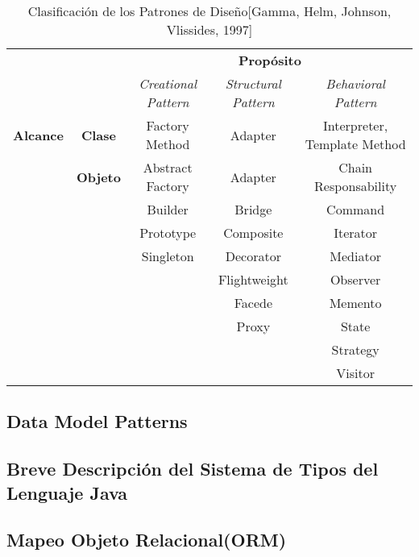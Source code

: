 \begin{center}
    \begin{table}[H]
        \begin{tabular}{|c|c|c|c|c|}
            \cline{3-5}
            \multicolumn{1}{c}{} & \multicolumn{1}{c|}{} & \multicolumn{3}{c|}{\textbf{Propósito}}\\
            \cline{3-5}
            \multicolumn{1}{c}{} & \multicolumn{1}{c|}{} & \multicolumn{1}{c|}{\textit{Creational Pattern}} &
                                   \multicolumn{1}{c|}{\textit{Structural Pattern}} &
                                   \multicolumn{1}{c|}{\textit{Behavioral Pattern}}\\
            \hline
            \textbf{Alcance} & \textbf{Clase}  & Factory Method   & Adapter      & Interpreter, \newline Template Method\\ \cline{2-5}
                             & \textbf{Objeto} & Abstract Factory & Adapter      & Chain Responsability\\
                             &                 & Builder          & Bridge       & Command \\
                             &                 & Prototype        & Composite    & Iterator\\
                             &                 & Singleton        & Decorator    & Mediator\\
                             &                 &                  & Flightweight & Observer\\
                             &                 &                  & Facede       & Memento\\
                             &                 &                  & Proxy        & State\\
                             &                 &                  &              & Strategy\\
                             &                 &                  &              & Visitor\\
            \hline
        \end{tabular}
        \caption{Clasificación de los Patrones de Diseño[Gamma, Helm, Johnson, Vlissides, 1997]}
    \end{table}
\end{center}
\subsection{Data Model Patterns}
\subsection{Breve Descripción del Sistema de Tipos del Lenguaje Java}
\subsection{Mapeo Objeto Relacional(ORM)}
\noindent